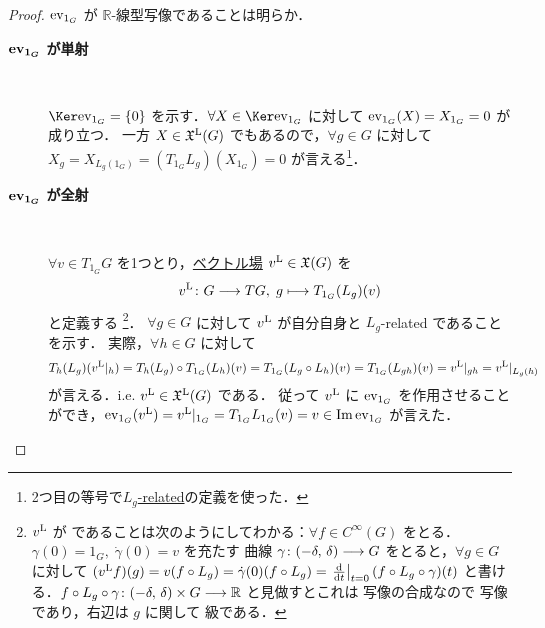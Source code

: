 \documentclass[TQFT_main]{subfiles}
\begin{document}
\begin{proof}
    $\mathrm{ev}_{1_G}$ が $\mathbb{R}$-線型写像であることは明らか．
    \begin{description}
        \item[\textbf{$\bm{\mathrm{ev}_{1_G}}$ が単射}]　
        
        $\Ker \evalunit = \{ 0 \}$ を示す．$\forall X \in \Ker \evalunit$ に対して $\mathrm{ev}_{1_G} (X) = X_{1_G} = 0$ が成り立つ．
        一方 $X \in \mathfrak{X}^{\mathrm{L}}(G)$ でもあるので，$\forall g \in G$ に対して $X_g = X_{L_g(1_G)} = (T_{1_G} L_g)(X_{1_G}) = 0$ が言える\footnote{2つ目の等号で\hyperref[def:F-related]{$L_g$-related}の定義を使った．}．
        \item[\textbf{$\bm{\mathrm{ev}_{1_G}}$ が全射}]　
        
        $\forall v \in T_{1_G} G$ を1つとり，\hyperref[def:vecf]{\cinfty ベクトル場} $v^{\mathrm{L}} \in \mathfrak{X}(G)$ を
        \begin{align}
            \label{eq:vL}
            v^{\mathrm{L}} \colon G \longrightarrow TG,\; g \longmapsto T_{1_G} (L_g) (v)
        \end{align}
        と定義する
        \footnote{
            $v^{\mathrm{L}}$ が \cinfty であることは次のようにしてわかる：$\forall f \in C^\infty (G)$ をとる．$\gamma(0) = 1_G,\; \dot{\gamma}(0) = v$ を充たす \cinfty 曲線 $\gamma \colon (-\delta,\, \delta) \longrightarrow G$ をとると，$\forall g \in G$ に対して $(\Lie{v} f)(g) = v (f \circ L_g) = \dot{\gamma}(0) (f \circ L_g) = \eval{\dv{}{t}}_{t=0} (f \circ L_g \circ \gamma)(t)$ と書ける．$f \circ L_g \circ \gamma \colon (-\delta,\, \delta) \times G \longrightarrow \mathbb{R}$ と見做すとこれは \cinfty 写像の合成なので \cinfty 写像であり，右辺は $g$ に関して \cinfty 級である．
        }．
        $\forall g \in G$ に対して $v^{\mathrm{L}}$ が自分自身と $L_g$-related であることを示す．
        実際，$\forall h \in G$ に対して
        \begin{align}
            T_h(L_g) (v^{\mathrm{L}}|_h) &= T_h(L_g) \circ T_{1_G}(L_h)(v) = T_{1_G}(L_g \circ L_h)(v) = T_{1_G}(L_{gh})(v) = v^{\mathrm{L}}|_{gh} = v^{\mathrm{L}}|_{L_g(h)}
        \end{align}
        が言える．i.e. $v^{\mathrm{L}} \in \mathfrak{X}^{\mathrm{L}}(G)$ である．
        従って $v^{\mathrm{L}}$ に $\mathrm{ev}_{1_G}$ を作用させることができ，$\mathrm{ev}_{1_G} (v^{\mathrm{L}}) = v^{\mathrm{L}}|_{1_G} = T_{1_G} L_{1_G} (v) = v \in \Im \mathrm{ev}_{1_G}$ が言えた．
    \end{description}
\end{proof}



\end{document}

